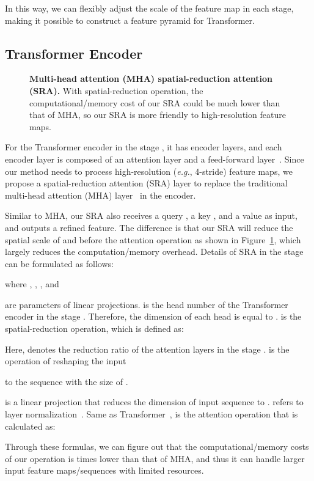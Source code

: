 \documentclass[10pt,twocolumn,letterpaper]{article}
\def\eg{\emph{e.g.}}
\begin{document}
In this way, we can flexibly adjust the scale of the feature map in each stage, making it possible to construct a feature pyramid for Transformer. 

\subsection{Transformer Encoder}
\begin{figure}
		\centering
		\setlength{\fboxrule}{0pt}
		\caption{\textbf{Multi-head attention (MHA) \vs spatial-reduction attention (SRA).} 
		With spatial-reduction operation, the computational/memory cost of our SRA could be much lower than that of MHA, so our SRA is more friendly to high-resolution feature maps.
		}
		\label{fig:att}
\end{figure}
For the Transformer encoder in the stage , it has  encoder layers, and each encoder layer is composed of an attention layer and a feed-forward layer~\cite{vaswani2017attention}.
Since our method needs to process high-resolution (\eg, 4-stride) feature maps, 
we propose a spatial-reduction attention (SRA) layer to replace the traditional multi-head attention (MHA) layer~\cite{vaswani2017attention} in the encoder.


Similar to MHA, our SRA also receives a query , a key , and a value  as input, and outputs a refined feature.
The difference is that our SRA will reduce the spatial scale of  and  before the attention operation as shown in Figure~\ref{fig:att}, which largely reduces the computation/memory overhead.
Details of SRA in the stage  can be formulated as follows:


where ,
,
, and

are parameters of linear projections. 
 is the head number of the Transformer encoder in the stage . 
Therefore, the dimension of each head  is equal to .
 is the spatial-reduction operation, which is defined as:

Here,  denotes the reduction ratio of the attention layers in the stage .
 is the operation of reshaping the input 

to the sequence with the size of .

is a linear projection that reduces the dimension of input sequence to .  refers to layer normalization~\cite{ba2016layer}.
Same as Transformer~\cite{vaswani2017attention},
 is the attention operation that is calculated as:

Through these formulas, we can figure out that the computational/memory costs of our  operation is  times lower than that of MHA, and thus it can handle larger input feature maps/sequences with limited resources.
\end{document}
